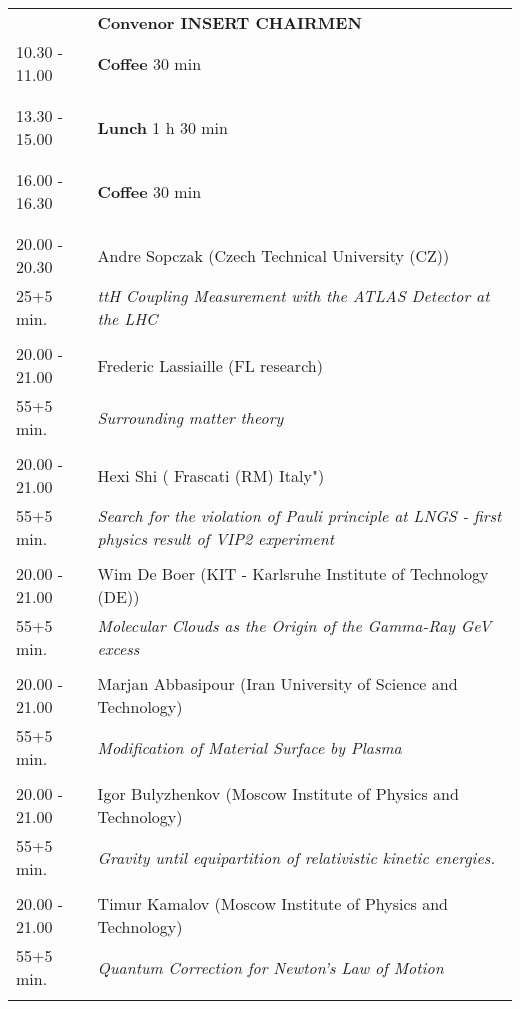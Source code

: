 \begin{longtable}{p{3cm}p{13cm}}
&\hfill {\bf Convenor INSERT CHAIRMEN }\\ 
10.30 - 11.00 & {\bf Coffee} \hfill 30 min \\ 
 & \\ 
 & \\ 
13.30 - 15.00 & {\bf Lunch} \hfill 1 h 30 min \\ 
 & \\ 
 & \\ 
16.00 - 16.30 & {\bf Coffee} \hfill 30 min \\ 
 & \\ 
 & \\ 
20.00 - 20.30 & Andre Sopczak (Czech Technical University (CZ))\\ 
25+5 min. & {\it ttH Coupling Measurement with the ATLAS Detector at the LHC}\\ 
 & \\ 
20.00 - 21.00 & Frederic Lassiaille (FL research)\\ 
55+5 min. & {\it Surrounding matter theory}\\ 
 & \\ 
20.00 - 21.00 & Hexi Shi ( Frascati (RM) Italy")\\ 
55+5 min. & {\it Search for the violation of Pauli principle at LNGS - first physics result of VIP2 experiment}\\ 
 & \\ 
20.00 - 21.00 & Wim De Boer (KIT - Karlsruhe Institute of  Technology (DE))\\ 
55+5 min. & {\it Molecular Clouds as the Origin of the Gamma-Ray GeV excess}\\ 
 & \\ 
20.00 - 21.00 & Marjan Abbasipour (Iran University of Science and Technology)\\ 
55+5 min. & {\it Modification of Material Surface by Plasma}\\ 
 & \\ 
20.00 - 21.00 & Igor Bulyzhenkov (Moscow Institute of Physics and Technology)\\ 
55+5 min. & {\it Gravity until equipartition of relativistic kinetic energies.}\\ 
 & \\ 
20.00 - 21.00 & Timur Kamalov (Moscow Institute of Physics and Technology)\\ 
55+5 min. & {\it Quantum Correction for Newton’s Law of Motion}\\ 
 & \\ 

\end{longtable}
